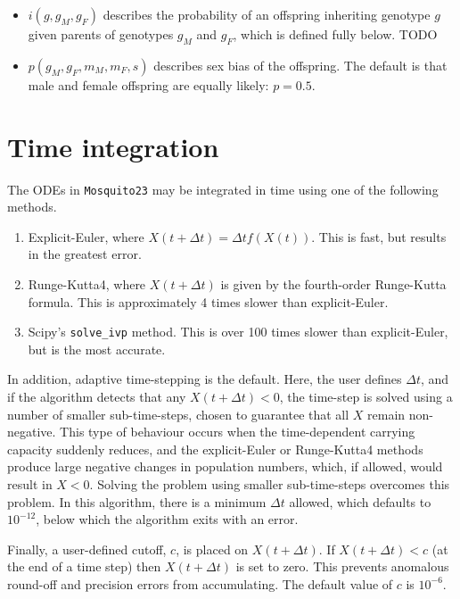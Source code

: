 \documentclass[11pt,a4paper]{article}
\begin{document}
\begin{itemize}
\begin{itemize}
\begin{equation}
\begin{array}{ll}
        (1 - s_{e})(1 - s_{n})  & \ \ \mbox{if}\ g_{M}\in\{cc\}
      \end{array}
      \right.
    \end{equation}
    Here $h_{e}$, $s_{e}$, $h_{n}$ and $s_{n}$ are user-defined parameters.
  \item The denominator normalises the result
  \end{itemize}
\item $i(g, g_{M}, g_{F})$ describes the probability of an offspring inheriting genotype $g$ given parents of genotypes $g_{M}$ and $g_{F}$, which is defined fully below.  TODO
\item $p(g_{M}, g_{F}, m_{M}, m_{F}, s)$ describes sex bias of the offspring.  The default is that male and female offspring are equally likely: $p=0.5$.
\end{itemize}

\section{Time integration}

The ODEs in {\tt Mosquito23} may be integrated in time using one of the following methods.
\begin{enumerate}
\item Explicit-Euler, where $X(t + \Delta t) = \Delta t f(X(t))$.  This is fast, but results in the greatest error.
\item Runge-Kutta4, where $X(t + \Delta t)$ is given by the fourth-order Runge-Kutta formula.  This is approximately 4 times slower than explicit-Euler.
\item Scipy's {\tt solve\_ivp} method.  This is over 100 times slower than explicit-Euler, but is the most accurate.
\end{enumerate}

In addition, adaptive time-stepping is the default.  Here, the user defines $\Delta t$, and if the algorithm detects that any $X(t + \Delta t) < 0$, the time-step is solved using a number of smaller sub-time-steps, chosen to guarantee that all $X$ remain non-negative.  This type of behaviour occurs when the time-dependent carrying capacity suddenly reduces, and the explicit-Euler or Runge-Kutta4 methods produce large negative changes in population numbers, which, if allowed, would result in $X<0$.  Solving the problem using smaller sub-time-steps overcomes this problem.  In this algorithm, there is a minimum $\Delta t$ allowed, which defaults to $10^{-12}$, below which the algorithm exits with an error.

Finally, a user-defined cutoff, $c$, is placed on $X(t + \Delta t)$.  If $X(t + \Delta t) < c$ (at the end of a time step) then $X(t + \Delta t)$ is set to zero.  This prevents anomalous round-off and precision errors from accumulating.  The default value of $c$ is $10^{-6}$.
\end{document}
